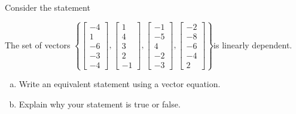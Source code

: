 
\begin{exerciseStatement}


Consider the statement 
\begin{center}\begin{minipage}{0.8\textwidth}
 The set of vectors \( \left\{ \left[\begin{array}{c}
-4 \\
1 \\
-6 \\
-3 \\
-4
\end{array}\right] , \left[\begin{array}{c}
1 \\
4 \\
3 \\
2 \\
-1
\end{array}\right] , \left[\begin{array}{c}
-1 \\
-5 \\
4 \\
-2 \\
-3
\end{array}\right] , \left[\begin{array}{c}
-2 \\
-8 \\
-6 \\
-4 \\
2
\end{array}\right] \right\} \)is linearly dependent.
\end{minipage}\end{center}
    


\begin{enumerate}[(a)]
\item  Write an equivalent statement using a vector equation.
\item  Explain why your statement is true or false.
\end{enumerate}
    
\end{exerciseStatement}
    
